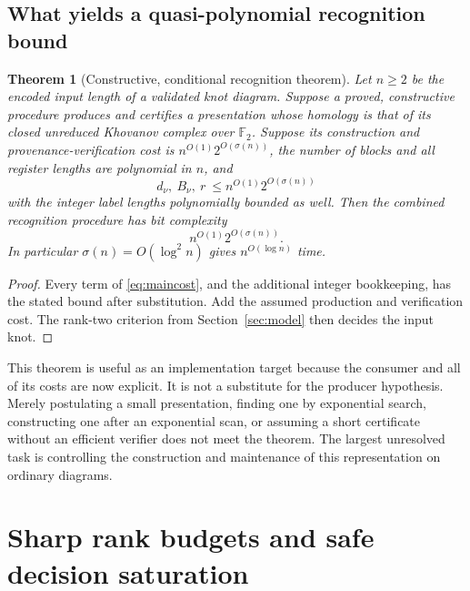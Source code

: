 \documentclass[11pt,letterpaper]{article}
\newcommand{\F}{{\mathbb F_2}}
\newtheorem{theorem}{Theorem}[section]
\theoremstyle{definition}
\theoremstyle{remark}
\numberwithin{equation}{section}
\begin{document}
\subsection{What yields a quasi-polynomial recognition bound}
\begin{theorem}[Constructive, conditional recognition theorem]
\label{thm:conditional}
Let $n\ge2$ be the encoded input length of a validated knot diagram.
Suppose a proved, constructive procedure produces and certifies a
presentation whose homology is that of its closed unreduced Khovanov
complex over $\F$. Suppose its construction and provenance-verification
cost is $n^{O(1)}2^{O(\sigma(n))}$, the number of blocks and all register
lengths are polynomial in $n$, and
\[
 d_\nu,\ B_\nu,\ r\ \le n^{O(1)}2^{O(\sigma(n))}
\]
with the integer label lengths polynomially bounded as well. Then the
combined recognition procedure has bit complexity
\begin{equation}
 n^{O(1)}2^{O(\sigma(n))}.
 \label{eq:conditional}
\end{equation}
In particular $\sigma(n)=O(\log^2 n)$ gives $n^{O(\log n)}$ time.
\end{theorem}
\begin{proof}
Every term of \eqref{eq:maincost}, and the additional integer bookkeeping,
has the stated bound after substitution. Add the assumed production and
verification cost. The rank-two criterion from Section~\ref{sec:model}
then decides the input knot.
\end{proof}

This theorem is useful as an implementation target because the consumer
and all of its costs are now explicit. It is not a substitute for the
producer hypothesis. Merely postulating a small presentation, finding one
by exponential search, constructing one after an exponential scan, or
assuming a short certificate without an efficient verifier does not meet
the theorem. The largest unresolved task is controlling the construction
and maintenance of this representation on ordinary diagrams.

\section{Sharp rank budgets and safe decision saturation}
\label{sec:budget}
\end{document}
